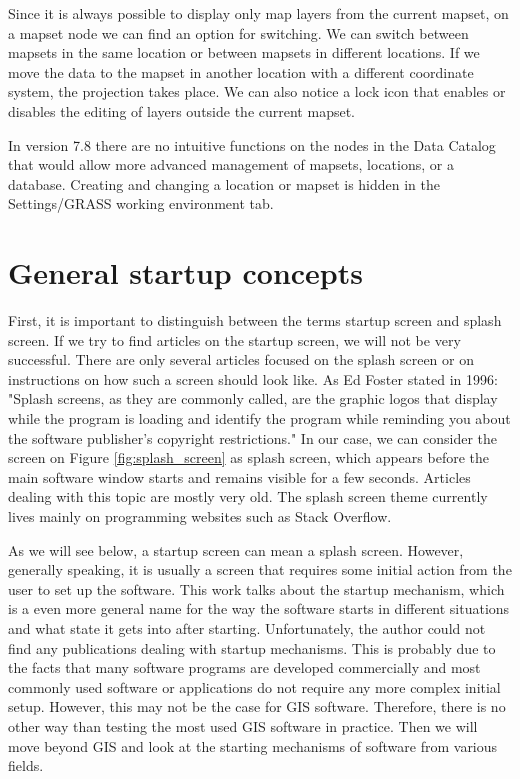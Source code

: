 \documentclass[a4paper,10pt,twoside]{article}
\begin{document}
Since it is always possible to display only map layers from the current mapset, on a mapset node we can find an option for switching. We can switch between mapsets in the same location or between mapsets in different locations. If we move the data to the mapset in another location with a different coordinate system, the projection takes place. We can also notice a lock icon that enables or disables the editing of layers outside the current mapset. 

In version 7.8 there are no intuitive functions on the nodes in the Data Catalog that would allow more advanced management of mapsets, locations, or a database. Creating and changing a location or mapset is hidden in the Settings/GRASS working environment tab.


\newpage
\vspace*{-1cm}
\section{General startup concepts}
\noindent
\large
First, it is important to distinguish between the terms startup screen and splash screen. If we try to find articles on the startup screen, we will not be very successful. There are only several articles focused on the splash screen or on instructions on how such a screen should look like. As Ed Foster stated in 1996: "Splash screens, as they are commonly called, are the graphic logos that display while the program is loading and identify the program while reminding you about the software publisher's copyright restrictions." In our case, we can consider the screen on Figure \ref{fig:splash_screen} as splash screen, which appears before the main software window starts and remains visible for a few seconds. Articles dealing with this topic are mostly very old. The splash screen theme currently lives mainly on programming websites such as Stack Overflow.

As we will see below, a startup screen can mean a splash screen. However, generally speaking, it is usually a screen that requires some initial action from the user to set up the software. This work talks about the startup mechanism, which is a even more general name for the way the software starts in different situations and what state it gets into after starting. Unfortunately, the author could not find any publications dealing with startup mechanisms. This is probably due to the facts that many software programs are developed commercially and most commonly used software or applications do not require any more complex initial setup. However, this may not be the case for GIS software. Therefore, there is no other way than testing the most used GIS software in practice. Then we will move beyond GIS and look at the starting mechanisms of software from various fields.
\end{document}
